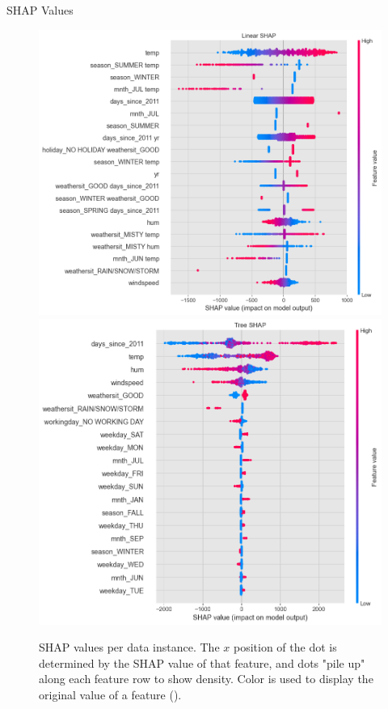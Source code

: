 \documentclass[10pt]{beamer}
\begin{document}
\begin{frame}{SHAP Values}
\begin{center}
  \begin{figure}
    \includegraphics[scale=0.22]{images/interpretable_ml_122_0.png}
    \includegraphics[scale=0.22]{images/interpretable_ml_137_0.png}
    \caption{SHAP values per data instance. The $x$ position of the dot is determined by the SHAP value of that feature, and dots "pile up" along each feature row to show density. Color is used to display the original value of a feature (\cite{NIPS2017_7062}).}
  \end{figure}
\end{center}
\end{frame}
\end{document}
